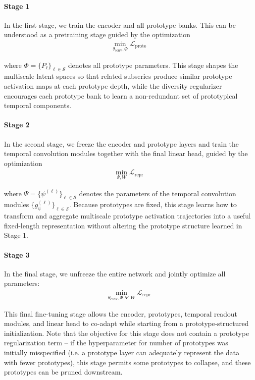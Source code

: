 \documentclass{article}
\renewcommand{\t}{\theta}
\begin{document}
\paragraph{Stage 1} In the first stage, we train the encoder and all prototype banks. This can be understood as a pretraining stage guided by the optimization 
\begin{align*}
    \min_{\t_{\text{conv}}, \Phi} \mathcal L_{\text{proto}}
\end{align*}

where $\Phi = \{P_\ell\}_{\ell \in \mathcal S}$ denotes all prototype parameters. This stage shapes the multiscale latent spaces so that related subseries produce similar prototype activation maps at each prototype depth, while the diversity regularizer encourages each prototype bank to learn a non-redundant set of prototypical temporal components.

\paragraph{Stage 2} In the second stage, we freeze the encoder and prototype layers and train the temporal convolution modules together with the final linear head, guided by the optimization 
\begin{align*}
    \min_{\Psi, W} \mathcal L_{\text{repr}}
\end{align*}

where $\Psi = \{\psi^{(\ell)}\}_{\ell \in \mathcal S}$ denotes the parameters of the temporal convolution modules $\{g_{\psi}^{(\ell)}\}_{\ell \in \mathcal S}$. Because prototypes are fixed, this stage learns how to transform and aggregate multiscale prototype activation trajectories into a useful fixed-length representation without altering the prototype structure learned in Stage 1.

\paragraph{Stage 3} In the final stage, we unfreeze the entire network and jointly optimize all parameters:
\begin{align*}
    \min_{\t_{\text{conv}}, \Phi, \Psi, W} \mathcal L_{\text{repr}}
\end{align*}

This final fine-tuning stage allows the encoder, prototypes, temporal readout modules, and linear head to co-adapt while starting from a prototype-structured initialization. Note that the objective for this stage does not contain a prototype regularization term -- if the hyperparameter for number of prototypes was initially misspecified (i.e. a prototype layer can adequately represent the data with fewer prototypes), this stage permits some prototypes to collapse, and these prototypes can be pruned downstream.
\end{document}
